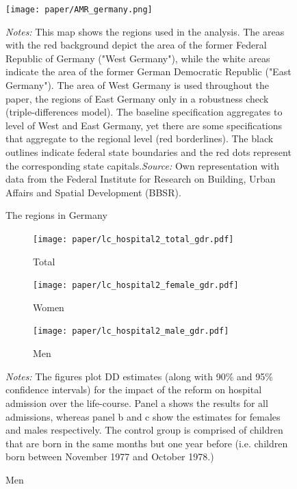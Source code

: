\documentclass[11pt, a4paper]{article} %
\begin{document}
\begin{figure}[H]\centering
	\caption{The regions in Germany}\label{fig: AMR_regions_Germany}
	\texttt{[image: paper/AMR\_germany.png]}
	\scriptsize
	\begin{minipage}{0.9 \linewidth}
		\emph{Notes:} This map shows the regions used in the analysis. The areas with the red background depict the area of the former Federal Republic of Germany ("West Germany"), while the white areas indicate the area of the former German Democratic Republic ("East Germany"). The area of West Germany is used throughout the paper, the regions of East Germany only in a robustness check (triple-differences model). The baseline specification aggregates to level of West and East Germany, yet there are some specifications that aggregate to the regional level (red borderlines). The black outlines indicate federal state boundaries and the red dots represent the corresponding state capitals.\newline \emph{Source:} Own representation with data from the Federal Institute for Research on Building, Urban Affairs and Spatial Development (BBSR).
	\end{minipage}
\end{figure}





\newpage
\vspace*{\fill}
\begin{figure}[H]\centering
	\caption{Life-course approach}\label{fig: lc_hospital2_gdr_DD}
	\begin{subfigure}[h]{0.48\linewidth}\centering\caption{Total}
		\texttt{[image: paper/lc\_hospital2\_total\_gdr.pdf]}
	\end{subfigure}
	
	
	\begin{subfigure}[h]{0.48\linewidth}\centering\caption{Women}
		\texttt{[image: paper/lc\_hospital2\_female\_gdr.pdf]}
	\end{subfigure}
	\quad
	\begin{subfigure}[h]{0.48\linewidth}\centering\caption{Men}
		\texttt{[image: paper/lc\_hospital2\_male\_gdr.pdf]}
	\end{subfigure}
	\scriptsize
	\begin{minipage}{\linewidth}
		\emph{Notes:} The figures plot DD estimates (along with 90\% and 95\% confidence intervals) for the impact of the reform on hospital admission over the life-course. Panel a shows the results for all admissions, whereas panel b and c show the estimates for females and males respectively. The control group is comprised of children	that are born in the same months but one year before (i.e. children born between November 1977 and October 1978.)
	\end{minipage}
\end{figure}
\vspace*{\fill}\clearpage
\newpage
\end{document}
